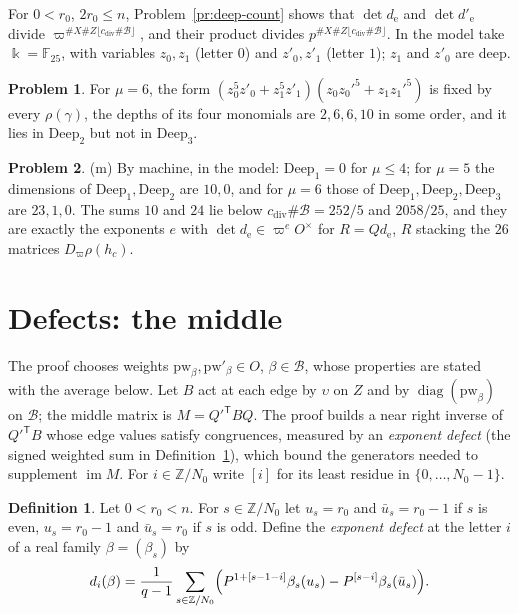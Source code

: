 \documentclass[reqno]{amsart}
\numberwithin{equation}{section}
\theoremstyle{plain}
\theoremstyle{definition}
\newtheorem{problem}{Problem}[section]
\newtheorem{definition}[theorem]{Definition}
\theoremstyle{remark}
\newcommand{\Z}{\mathbb{Z}}
\newcommand{\F}{\mathbb{F}}
\newcommand{\Bc}{\mathcal B}
\newcommand{\Deep}{\mathrm{Deep}}
\newcommand{\cdiv}{c_{\mathrm{div}}}
\begin{document}
For \(0 < r_0\), \(2r_0 \le n\), Problem~\ref{pr:deep-count} shows that \(\det d_{\mathrm e}\) and \(\det d'_{\mathrm e}\) divide \(\varpi^{\#X\#Z\lfloor\cdiv\#\Bc\rfloor}\), and their product divides \(p^{\#X\#Z\lfloor\cdiv\#\Bc\rfloor}\).  In the model take \(\Bbbk = \F_{25}\), with variables \(z_0, z_1\) (letter \(0\)) and \(z'_0, z'_1\) (letter \(1\)); \(z_1\) and \(z'_0\) are deep.

\begin{problem}\label{pr:invariant}
For \(\mu = 6\), the form \((z_0^5z'_0 + z_1^5z'_1)(z_0z_0'^5 + z_1z_1'^5)\) is fixed by every \(\rho(\gamma)\), the depths of its four monomials are \(2, 6, 6, 10\) in some order, and it lies in \(\Deep_2\) but not in \(\Deep_3\).
\end{problem}

\begin{problem}\label{pr:deep-table}
(m) By machine, in the model: \(\Deep_1 = 0\) for \(\mu \le 4\); for \(\mu = 5\) the dimensions of \(\Deep_1, \Deep_2\) are \(10, 0\), and for \(\mu = 6\) those of \(\Deep_1, \Deep_2, \Deep_3\) are \(23, 1, 0\).  The sums \(10\) and \(24\) lie below \(\cdiv\#\Bc = 252/5\) and \(2058/25\), and they are exactly the exponents \(e\) with \(\det d_{\mathrm e} \in \varpi^eO^\times\) for \(R = Qd_{\mathrm e}\), \(R\) stacking the \(26\) matrices \(D_\varpi\rho(h_c)\).
\end{problem}

\section{Defects: the middle}\label{sec:middle}

The proof chooses weights \(\mathrm{pw}_\beta, \mathrm{pw}'_\beta \in O\), \(\beta \in \Bc\), whose properties are stated with the average below.  Let \(B\) act at each edge by \(\upsilon\) on \(Z\) and by \(\operatorname{diag}(\mathrm{pw}_\beta)\) on \(\Bc\); the middle matrix is \(M = Q'^{\mathsf T}BQ\).  The proof builds a near right inverse of \(Q'^{\mathsf T}B\) whose edge values satisfy congruences, measured by an \emph{exponent defect} (the signed weighted sum in Definition~\ref{def:defect}), which bound the generators needed to supplement \(\operatorname{im}M\).  For \(i \in \Z/N_0\) write \([i]\) for its least residue in \(\{0, \dots, N_0 - 1\}\).

\begin{definition}\label{def:defect}
Let \(0 < r_0 < n\).  For \(s \in \Z/N_0\) let \(u_s = r_0\) and \(\bar u_s = r_0 - 1\) if \(s\) is even, \(u_s = r_0 - 1\) and \(\bar u_s = r_0\) if \(s\) is odd.  Define the \emph{exponent defect} at the letter \(i\) of a real family \(\beta = (\beta_s)\) by
\[
  d_i(\beta) = \frac{1}{q-1}\sum_{s \in \Z/N_0}\Bigl(P^{1 + [s - 1 - i]}\beta_s(u_s) - P^{[s - i]}\beta_s(\bar u_s)\Bigr) .
\]
\end{definition}
\end{document}
